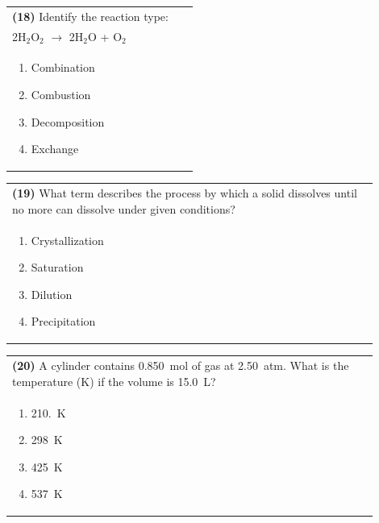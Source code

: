 \documentclass{article}
\begin{document}
\noindent\begin{tabular}{|p{0.9\linewidth}|}
\hline
\textbf{(18)} Identify the reaction type:\\[0.2cm]
2H$_2$O$_2$ $\rightarrow$ 2H$_2$O + O$_2$\\[0.2cm]
\begin{minipage}[t]{0.85\linewidth}
\begin{enumerate}[label=\alph*.]
\item Combination
\item Combustion
\item Decomposition
\item Exchange
\end{enumerate}
\end{minipage}\\[0.2cm]
\hline
\end{tabular}

\noindent\begin{tabular}{|p{0.9\linewidth}|}
\hline
\textbf{(19)} What term describes the process by which a solid dissolves until no more can dissolve under given conditions?\\[0.2cm]
\begin{minipage}[t]{0.85\linewidth}
\begin{enumerate}[label=\alph*.]
\item Crystallization
\item Saturation
\item Dilution
\item Precipitation
\end{enumerate}
\end{minipage}\\[0.2cm]
\hline
\end{tabular}

\noindent\begin{tabular}{|p{0.9\linewidth}|}
\hline
\textbf{(20)} A cylinder contains 0.850~mol of gas at 2.50~atm. What is the temperature (K) if the volume is 15.0~L?\\[0.2cm]

\begin{minipage}[t]{0.85\linewidth}
\begin{enumerate}[label=\alph*.]
\item 210.~K
\item 298~K
\item 425~K
\item 537~K
\end{enumerate}
\end{minipage}\\[0.2cm]
\hline
\end{tabular}
\end{document}
